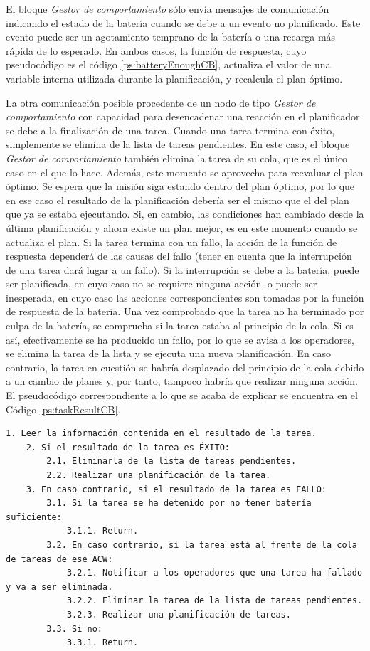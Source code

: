 \documentclass[fontsize=11pt, English=false, Español=true, Myfinal=true, twoside, numbers=noenddot]{scrbook}
\begin{document}
El bloque \emph{Gestor de comportamiento} sólo envía mensajes de comunicación indicando el estado de la batería cuando se debe a un evento no planificado. Este evento puede ser un agotamiento temprano de la batería o una recarga más rápida de lo esperado. En ambos casos, la función de respuesta, cuyo pseudocódigo es el código \ref{ps:batteryEnoughCB}, actualiza el valor de una variable interna utilizada durante la planificación, y recalcula el plan óptimo.

La otra comunicación posible procedente de un nodo de tipo \emph{Gestor de comportamiento} con capacidad para desencadenar una reacción en el planificador se debe a la finalización de una tarea. Cuando una tarea termina con éxito, simplemente se elimina de la lista de tareas pendientes. En este caso, el bloque \emph{Gestor de comportamiento} también elimina la tarea de su cola, que es el único caso en el que lo hace. Además, este momento se aprovecha para reevaluar el plan óptimo. Se espera que la misión siga estando dentro del plan óptimo, por lo que en ese caso el resultado de la planificación debería ser el mismo que el del plan que ya se estaba ejecutando. Si, en cambio, las condiciones han cambiado desde la última planificación y ahora existe un plan mejor, es en este momento cuando se actualiza el plan. Si la tarea termina con un fallo, la acción de la función de respuesta dependerá de las causas del fallo (tener en cuenta que la interrupción de una tarea dará lugar a un fallo). Si la interrupción se debe a la batería, puede ser planificada, en cuyo caso no se requiere ninguna acción, o puede ser inesperada, en cuyo caso las acciones correspondientes son tomadas por la función de respuesta de la batería. Una vez comprobado que la tarea no ha terminado por culpa de la batería, se comprueba si la tarea estaba al principio de la cola. Si es así, efectivamente se ha producido un fallo, por lo que se avisa a los operadores, se elimina la tarea de la lista y se ejecuta una nueva planificación. En caso contrario, la tarea en cuestión se habría desplazado del principio de la cola debido a un cambio de planes y, por tanto, tampoco habría que realizar ninguna acción. El pseudocódigo correspondiente a lo que se acaba de explicar se encuentra en el Código \ref{ps:taskResultCB}.

\begin{lstlisting}[caption={Función de respuesta que se ejecuta cuando un \emph{Gestor de comportamiento} comunica el resultado de una tarea}, breaklines=true, label=ps:taskResultCB]
	1. Leer la información contenida en el resultado de la tarea.
	2. Si el resultado de la tarea es ÉXITO:
		2.1. Eliminarla de la lista de tareas pendientes.
		2.2. Realizar una planificación de la tarea.
	3. En caso contrario, si el resultado de la tarea es FALLO:
		3.1. Si la tarea se ha detenido por no tener batería suficiente:
			3.1.1. Return.
		3.2. En caso contrario, si la tarea está al frente de la cola de tareas de ese ACW:
			3.2.1. Notificar a los operadores que una tarea ha fallado y va a ser eliminada.
			3.2.2. Eliminar la tarea de la lista de tareas pendientes.
			3.2.3. Realizar una planificación de tareas.
		3.3. Si no:
			3.3.1. Return.
\end{lstlisting}
\end{document}
